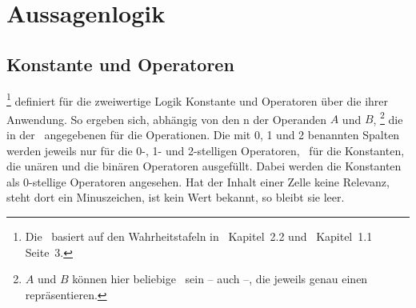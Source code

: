 \section{Aussagenlogik}%
\label{sec:Aussagenlogik}
\hidden{\Aussagenlogik}

\subsection{Konstante und Operatoren}%
\label{sub:Operatoren}

%
\footnote{%
	Die \tablename\ basiert auf den Wahrheitstafeln in~\cite{bib:Junktor} Kapitel~2.2 und~\cite{bib:Rautenberg} Kapitel~1.1 Seite~3.
}
definiert für die zweiwertige Logik Konstante und Operatoren über die  ihrer Anwendung.
So ergeben sich, abhängig von den n der Operanden $A$ und $B$,%
\footnote{%
	$A$ und $B$ können hier beliebige \Aussagen\ sein -- auch  --, die jeweils genau einen  repräsentieren.
}
die in der \tablename\ angegebenen  für die Operationen.
Die mit 0, 1 und 2 benannten Spalten werden jeweils nur für die 0-, 1- und 2-stelligen Operatoren, \textdh\ für die Konstanten, die unären und die binären Operatoren ausgefüllt.
Dabei werden die Konstanten als 0-stellige Operatoren angesehen.
Hat der Inhalt einer Zelle keine Relevanz, steht dort ein Minuszeichen, ist kein Wert bekannt, so bleibt sie leer.

